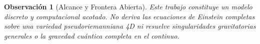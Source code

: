\documentclass[11pt,a4paper]{article}
\newtheorem{remark}{Observaci\'on}
\begin{document}
\begin{remark}[Alcance y Frontera Abierta]
Este trabajo constituye un modelo discreto y computacional acotado. No deriva las ecuaciones de Einstein completas sobre una variedad pseudoriemanniana 4D ni resuelve singularidades gravitatorias generales o la gravedad cu\'antica completa en el continuo.
\end{remark}
\end{document}
